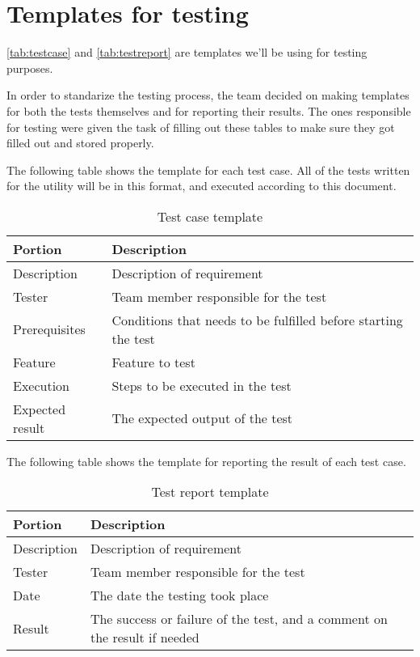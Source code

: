 \section{Templates for testing}
\autoref{tab:testcase} and \autoref{tab:testreport} are templates we'll be
using for testing purposes.

In order to standarize the testing process, the team decided on making templates for both the tests themselves and for reporting their results. The ones responsible for testing were given the task of filling out these tables to make sure they got filled out and stored properly.

The following table shows the template for each test case. All of the tests written for the utility will be in this format, and executed according to this document.

\begin{table}[ht] \small \center
\caption{Test case template \label{tab:testcase}}
\begin{tabular}{l l}
	\toprule
	Portion & Description \\
	\midrule
	Description & Description of requirement \\
	Tester & Team member responsible for the test \\
	Prerequisites & Conditions that needs to be fulfilled before starting the test \\
	Feature & Feature to test \\
	Execution & Steps to be executed in the test \\
	Expected result & The expected output of the test \\
	\bottomrule
\end{tabular}
\end{table}

The following table shows the template for reporting the result of each test case.

\begin{table}[ht] \small \center
\caption{Test report template \label{tab:testreport}}
\begin{tabular}{l l}
	\toprule
	Portion & Description \\
	\midrule
	Description & Description of requirement \\
	Tester & Team member responsible for the test \\
	Date & The date the testing took place \\
	Result & The success or failure of the test, and a comment on the result if needed \\
	\bottomrule
\end{tabular}
\end{table}

